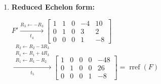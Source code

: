 \begin{enumerate}
    \item
    \textbf{Reduced Echelon form:} \\[1.0em]
    \begin{answer}
        $F' \xrightarrow[t_4]{R_3 \leftarrow -R_3}
        \begin{bmatrix}
            1 & 1 & 0 & -4 & 10 \\
            0 & 1 & 0 & 3 & 2 \\
            0 & 0 & 0 & 1 & -8
        \end{bmatrix}
        $ \\[1.0em]

        $\xrightarrow[t_5]{
            \substack{
                R_2 \leftarrow R_2-3R_3 \\
                R_1 \leftarrow R_1+4R_3 \\
                R_1 \leftarrow R_1-R_2
            }
        }
        \begin{bmatrix}
            1 & 0 & 0 & 0 & -48 \\
            0 & 1 & 0 & 0 & 26 \\
            0 & 0 & 0 & 1 & -8
        \end{bmatrix}
        = \operatorname{rref}(F)$
    \end{answer}
\end{enumerate}
